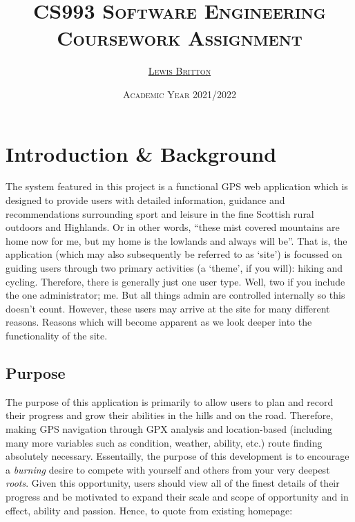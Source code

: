 \documentclass[11pt, english]{article}
\begin{document}

	\title{\textsc{CS993 Software Engineering\\ Coursework Assignment}}
	\author{\href{http://lewisbritton.com}{\textsc{Lewis Britton}}}
	\date{\textsc{Academic Year 2021/2022}}
        \maketitle

\newpage


	\renewcommand{\contentsname}{Table of Contents}

	\tableofcontents

\newpage


\section{Introduction \& Background}

	The system featured in this project is a functional GPS web application which is designed to provide users with detailed information, guidance and recommendations surrounding sport and leisure in the fine Scottish rural outdoors and Highlands. Or in other words, ``these mist covered mountains are home now for me, but my home is the lowlands and always will be''. That is, the application (which may also subsequently be referred to as `site') is focussed on guiding users through two primary activities (a `theme', if you will): hiking and cycling. Therefore, there is generally just one user type. Well, two if you include the one administrator; me. But all things admin are controlled internally so this doesn't count. However, these users may arrive at the site for many different reasons. Reasons which will become apparent as we look deeper into the functionality of the site.

	\subsection{Purpose}

	The purpose of this application is primarily to allow users to plan and record their progress and grow their abilities in the hills and on the road. Therefore, making GPS navigation through GPX analysis and location-based (including many more variables such as condition, weather, ability, etc.) route finding absolutely necessary. Essentailly, the purpose of this development is to encourage a \textit{burning} desire to compete with yourself and others from your very deepest \textit{roots}. Given this opportunity, users should view all of the finest details of their progress and be motivated to expand their scale and scope of opportunity and in effect, ability and passion. Hence, to quote from existing homepage:\\
\end{document}
